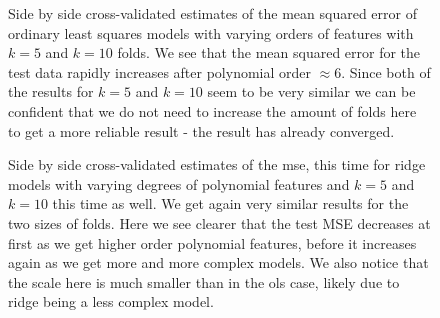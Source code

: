 \documentclass{article}
\begin{document}
\begin{figure}
    \centering
    \quad
    \caption{Side by side cross-validated estimates of the mean squared error of
        ordinary least squares models with varying orders of features with $k=5$ and
        $k=10$ folds. We see that the mean squared error for the test data rapidly
        increases after polynomial order $\approx 6$. Since both of the results for
        $k=5$ and $k=10$ seem to be very similar we can be confident that we do not
        need to increase the amount of folds here to get a more reliable result
        - the result has already converged.}
    \label{crossval-ols}
\end{figure}
\begin{figure}
    \centering
    \quad
    \caption{Side by side cross-validated estimates of the mse, this time for
        ridge models with varying degrees of polynomial features and $k=5$ and
        $k=10$ this time as well. We get again very similar results for the two
        sizes of folds. Here we see clearer that the test MSE decreases at first as
        we get higher order polynomial features, before it increases again as we get
        more and more complex models. We also notice that the scale here is much
        smaller than in the ols case, likely due to ridge being a less complex
        model.}
    \label{crossval-ridge}
\end{figure}
\end{document}
